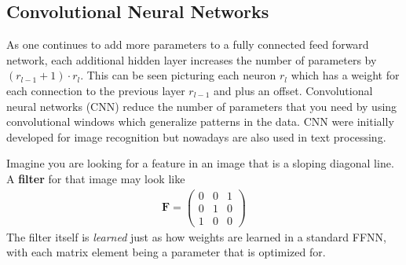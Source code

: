 \subsection{Convolutional Neural Networks}

As one continues to add more parameters to a fully connected feed forward network, each additional hidden layer increases the number of parameters by $(r_{l-1}+1)\cdot r_l$. This can be seen picturing each neuron $r_l$ which has a weight for each connection to the previous layer $r_{l-1}$ and  plus an offset. Convolutional neural networks (CNN) reduce the number of parameters that you need by using convolutional windows which generalize patterns in the data. CNN were initially developed for image recognition but nowadays are also used in text processing. 

Imagine you are looking for a feature in an image that is a sloping diagonal line. A \textbf{filter} for that image may look like
\begin{align}
    \textbf{F} = 
\begin{pmatrix}
0 & 0 & 1 \\
0 & 1 & 0 \\
1 & 0 & 0
\end{pmatrix}
\end{align}
The filter itself is \emph{learned} just as how weights are learned in a standard FFNN, with each matrix element being a parameter that is optimized for.

